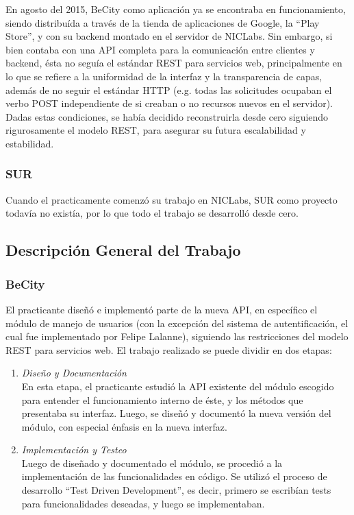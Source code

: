 \documentclass[11pt,letterpaper]{article}
\begin{document}
En agosto del 2015, BeCity como aplicación ya se encontraba en funcionamiento, siendo distribuída a través de la tienda de aplicaciones de Google, la ``Play Store'', y con su backend montado en el servidor de NICLabs. Sin embargo, si bien contaba con una API completa para la comunicación entre clientes y backend, ésta no seguía el estándar REST para servicios web, principalmente en lo que se refiere a la uniformidad de la interfaz y la transparencia de capas, además de no seguir el estándar HTTP (e.g. todas las solicitudes ocupaban el verbo POST independiente de si creaban o no recursos nuevos en el servidor). Dadas estas condiciones, se había decidido reconstruirla desde cero siguiendo rigurosamente el modelo REST, para asegurar su futura escalabilidad y estabilidad.

\subsubsection{SUR}

Cuando el practicamente comenzó su trabajo en NICLabs, SUR como proyecto todavía no existía, por lo que todo el trabajo se desarrolló desde cero.
\pagebreak
\subsection{Descripción General del Trabajo}

\subsubsection{BeCity}

El practicante diseñó e implementó parte de la nueva API, en específico el módulo de manejo de usuarios (con la excepción del sistema de autentificación, el cual fue implementado por Felipe Lalanne), siguiendo las restricciones del modelo REST para servicios web. El trabajo realizado se puede dividir en dos etapas:
\begin{enumerate}
    \item \emph{Diseño y Documentación} \\ En esta etapa, el practicante estudió la API existente del módulo escogido para entender el funcionamiento interno de éste, y los métodos que presentaba su interfaz. Luego, se diseñó y documentó la nueva versión del módulo, con especial énfasis en la nueva interfaz.
    \item \emph{Implementación y Testeo} \\ Luego de diseñado y documentado el módulo, se procedió a la implementación de las funcionalidades en código. Se utilizó el proceso de desarrollo ``Test Driven Development'', es decir, primero se escribían tests para funcionalidades deseadas, y luego se implementaban.
\end{enumerate}
\end{document}
